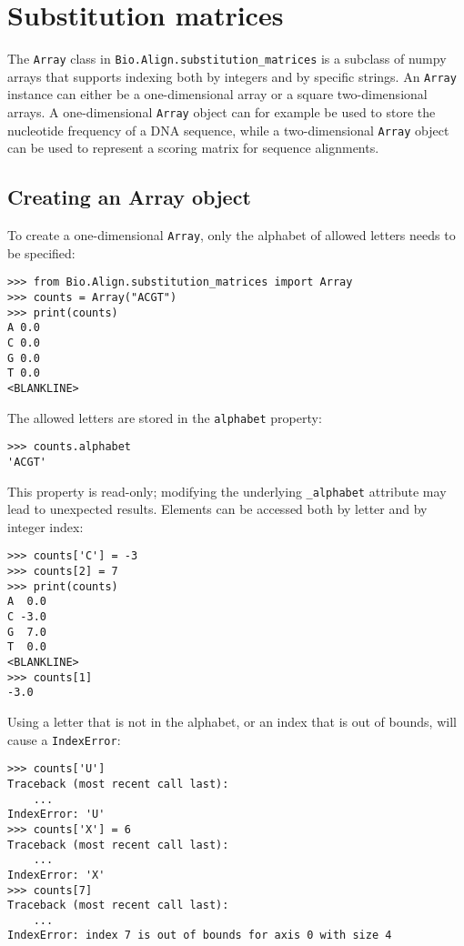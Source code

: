 \section{Substitution matrices}
\label{sec:substitution_matrices}

The \verb+Array+ class in \verb+Bio.Align.substitution_matrices+ is a subclass of numpy arrays that supports indexing both by integers and by specific strings. An \verb+Array+ instance can either be a one-dimensional array or a square two-dimensional arrays. A one-dimensional \verb+Array+ object can for example be used to store the nucleotide frequency of a DNA sequence, while a two-dimensional \verb+Array+ object can be used to represent a scoring matrix for sequence alignments.

\subsection*{Creating an Array object}

To create a one-dimensional \verb+Array+, only the alphabet of allowed letters needs to be specified:

\begin{verbatim}
>>> from Bio.Align.substitution_matrices import Array
>>> counts = Array("ACGT")
>>> print(counts)
A 0.0
C 0.0
G 0.0
T 0.0
<BLANKLINE>
\end{verbatim}
The allowed letters are stored in the \verb+alphabet+ property:

\begin{verbatim}
>>> counts.alphabet
'ACGT'
\end{verbatim}
This property is read-only; modifying the underlying \verb+_alphabet+ attribute may lead to unexpected results.
Elements can be accessed both by letter and by integer index:

\begin{verbatim}
>>> counts['C'] = -3
>>> counts[2] = 7
>>> print(counts)
A  0.0
C -3.0
G  7.0
T  0.0
<BLANKLINE>
>>> counts[1]
-3.0
\end{verbatim}

Using a letter that is not in the alphabet, or an index that is out of bounds, will cause a \verb+IndexError+:

\begin{verbatim}
>>> counts['U']
Traceback (most recent call last):
    ...
IndexError: 'U'
>>> counts['X'] = 6
Traceback (most recent call last):
    ...
IndexError: 'X'
>>> counts[7]
Traceback (most recent call last):
    ...
IndexError: index 7 is out of bounds for axis 0 with size 4
\end{verbatim}

